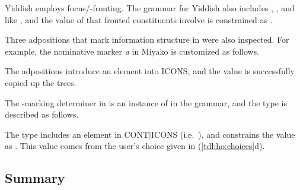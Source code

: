 Yiddish employs focus/-fronting. The grammar for Yiddish also
includes , ,
and  like , and the value of
 that fronted constituents involve is constrained as
.


Three adpositions that mark information structure in  were
also inspected.  For example, the nominative  marker \textit{a}
in Miyako is customized as follows.




\noindent The adpositions introduce an  element into
ICONS, and the value is successfully copied up the trees.  


The -marking determiner \textit{} in 
is an instance of  in the grammar, and the
type is described as follows.


\noindent The  type includes an
element in CONT{$\mid$}ICONS (i.e.\ ),
and 
constrains the value as .  This value comes from
the user's choice given in (\ref{tdl:ho:choices}d).


\subsection{Summary}
\label{11:ssec:lc:sum}


